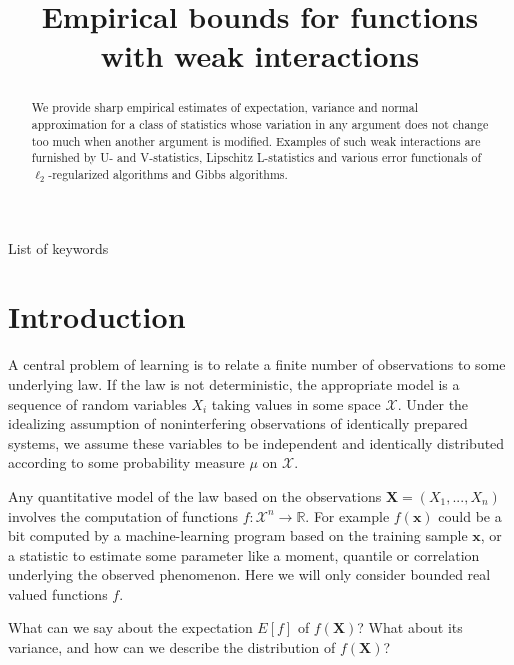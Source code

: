 \documentclass[final,12pt]{colt2018} %
\title[Short Title]{Empirical bounds for functions with weak interactions}
\begin{document}
\maketitle

\begin{abstract}
We provide sharp empirical estimates of expectation, variance and normal
approximation for a class of statistics whose variation in any argument does
not change too much when another argument is modified. Examples of such weak
interactions are furnished by U- and V-statistics, Lipschitz L-statistics
and various error functionals of $\ell_2$-regularized algorithms and Gibbs
algorithms.\end{abstract}

\begin{keywords}
List of keywords
\end{keywords}

\section{Introduction\label{Section Introduction}}

A central problem of learning is to relate a finite number of observations
to some underlying law. If the law is not deterministic, the appropriate
model is a sequence of random variables $X_{i}$ taking
values in some space $\mathcal{X}$. Under the idealizing assumption of
noninterfering observations of identically prepared systems, we assume these
variables to be independent and identically distributed according to some
probability measure $\mu $ on $\mathcal{X}$.%

Any quantitative model of the law based on the observations $\mathbf{X}%
=\left( X_{1},...,X_{n}\right) $ involves the computation of functions $f:%
\mathcal{X}^{n}\rightarrow 
\mathbb{R}
$. For example $f\left( \mathbf{x}\right) $ could be a bit computed by a
machine-learning program based on the training sample $\mathbf{x}$, or a
statistic to estimate some parameter like a moment, quantile or correlation
underlying the observed phenomenon. Here we will only consider bounded real
valued functions $f$.\textbf{\ }

What can we say about the expectation $E\left[ f\right] $ of $f\left( 
\mathbf{X}\right) $? What about its variance, and how can we describe the
distribution of $f\left( \mathbf{X}\right) $?
%
\end{document}
